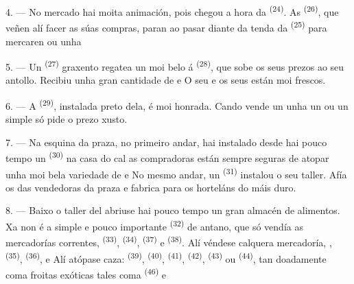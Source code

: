 \VUsaut{4.0mm}
\VUsaut{3.0mm}

4. --- No mercado hai moita animación, pois chegou a hora da 
\textsuperscript{(24)}. As  \textsuperscript{(26)}, que veñen
alí facer as súas compras, paran ao pasar diante da tenda da 
\textsuperscript{(25)} para mercaren  ou unha 

5. --- Un  \textsuperscript{(27)} graxento regatea un 
moi belo á  \textsuperscript{(28)}, que sobe os seus prezos ao seu
antollo. Recibiu unha gran cantidade de  e
 O seu  e os seus  están moi
frescos.

\VUsaut{4.0mm}
\VUsaut{3.0mm}

6. --- A  \textsuperscript{(29)}, instalada preto dela, é
moi honrada. Cando vende un  unha  un  ou un
simple  só pide o prezo xusto.

7. --- Na esquina da praza, no primeiro andar, hai instalado desde hai pouco tempo un
 \textsuperscript{(30)} na casa do cal as compradoras están
sempre seguras de atopar unha moi bela variedade de 
 e  No mesmo andar, un
 \textsuperscript{(31)} instalou o seu taller. Afía os
 das vendedoras da praza e fabrica para os horteláns 
do  máis duro.

\VUsaut{4.0mm}
\VUsaut{3.0mm}

8. --- Baixo o taller del abriuse hai pouco tempo un gran almacén de alimentos. Xa non
é a simple e pouco importante  \textsuperscript{(32)} de
antano, que só vendía as mercadorías correntes,  \textsuperscript{(33)},
 \textsuperscript{(34)}, 
\textsuperscript{(37)} e  \textsuperscript{(38)}. Alí véndese calquera
mercadoría, , 
\textsuperscript{(35)},  \textsuperscript{(36)}, 
 e  Alí atópase caza: 
\textsuperscript{(39)},  \textsuperscript{(40)}, 
\textsuperscript{(41)},  \textsuperscript{(42)},  \textsuperscript{(43)} ou  \textsuperscript{(44)}, tan
doadamente coma froitas exóticas tales coma 
\textsuperscript{(46)} e 

